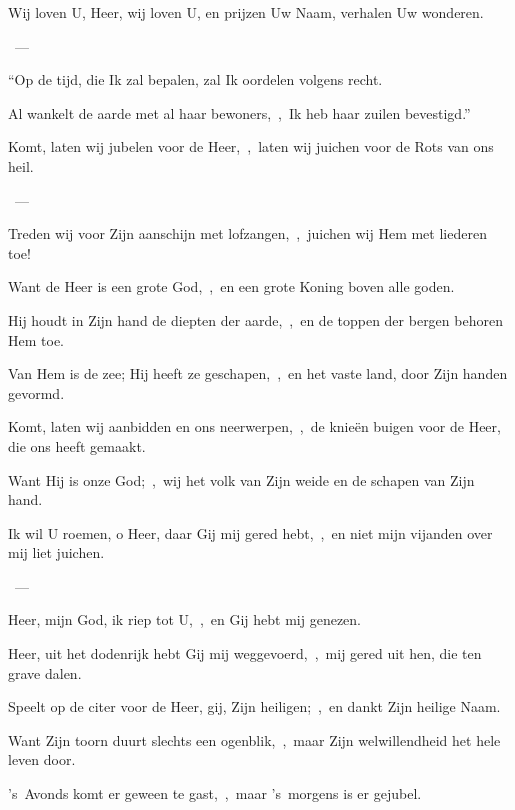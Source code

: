 \documentclass[12pt,twoside,a5paper]{article}
\begin{document}

\begin{halfparskip}
  Wij loven U, Heer, wij loven U, en prijzen Uw Naam, verhalen Uw wonderen.

  ~--- 

  ``Op de tijd, die Ik zal bepalen, zal Ik oordelen volgens recht.

  Al wankelt de aarde met al haar bewoners,~\sep\ Ik heb haar zuilen bevestigd.''
\end{halfparskip}


\begin{halfparskip}
  Komt, laten wij jubelen voor de Heer,~\sep\ laten wij juichen voor de Rots van ons heil.

  ~--- 

  Treden wij voor Zijn aanschijn met lofzangen,~\sep\ juichen wij Hem met liederen toe!

  Want de Heer is een grote God,~\sep\ en een grote Koning boven alle goden.

  Hij houdt in Zijn hand de diepten der aarde,~\sep\ en de toppen der bergen behoren Hem toe.

  Van Hem is de zee; Hij heeft ze geschapen,~\sep\ en het vaste land, door Zijn handen gevormd.

  Komt, laten wij aanbidden en ons neerwerpen,~\sep\ de knieën buigen voor de Heer, die ons heeft gemaakt.

  Want Hij is onze God;~\sep\ wij het volk van Zijn weide en de schapen van Zijn hand.
\end{halfparskip}


\begin{halfparskip}
  Ik wil U roemen, o Heer, daar Gij mij gered hebt,~\sep\ en niet mijn vijanden over mij liet juichen.

  ~--- 

  Heer, mijn God, ik riep tot U,~\sep\ en Gij hebt mij genezen.

  Heer, uit het dodenrijk hebt Gij mij weggevoerd,~\sep\ mij gered uit hen, die ten grave dalen.

  Speelt op de citer voor de Heer, gij, Zijn heiligen;~\sep\ en dankt Zijn heilige Naam.

  Want Zijn toorn duurt slechts een ogenblik,~\sep\ maar Zijn welwillendheid het hele leven door.

  's~Avonds komt er geween te gast,~\sep\ maar 's~morgens is er gejubel.
\end{halfparskip}
\end{document}

